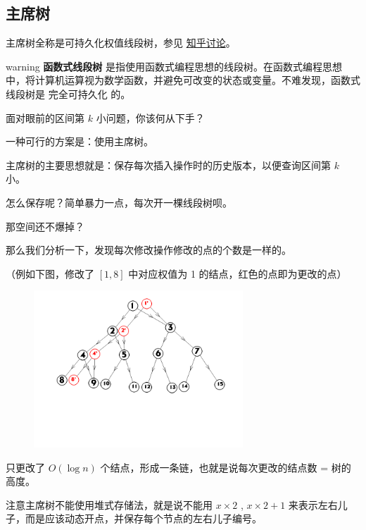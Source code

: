 
\subsection{主席树}

主席树全称是可持久化权值线段树，参见 \href{https://www.zhihu.com/question/59195374}{知乎讨论}。

\begin{NOTE}{warning}{}
\textbf{函数式线段树} 是指使用函数式编程思想的线段树。在函数式编程思想中，将计算机运算视为数学函数，并避免可改变的状态或变量。不难发现，函数式线段树是  完全可持久化  的。

\end{NOTE}


面对眼前的区间第 $k$ 小问题，你该何从下手？

一种可行的方案是：使用主席树。  

主席树的主要思想就是：保存每次插入操作时的历史版本，以便查询区间第 $k$ 小。

怎么保存呢？简单暴力一点，每次开一棵线段树呗。  

那空间还不爆掉？

那么我们分析一下，发现每次修改操作修改的点的个数是一样的。  

（例如下图，修改了 $[1,8]$ 中对应权值为 1 的结点，红色的点即为更改的点）  

\begin{figure}[htbp]
\centering
\includegraphics[width=0.7\textwidth]{docs/ds/images/persistent-seg.png} 

\end{figure}

只更改了 $O(\log{n})$ 个结点，形成一条链，也就是说每次更改的结点数 = 树的高度。  

注意主席树不能使用堆式存储法，就是说不能用 $x\times 2$ , $x\times 2+1$ 来表示左右儿子，而是应该动态开点，并保存每个节点的左右儿子编号。  

